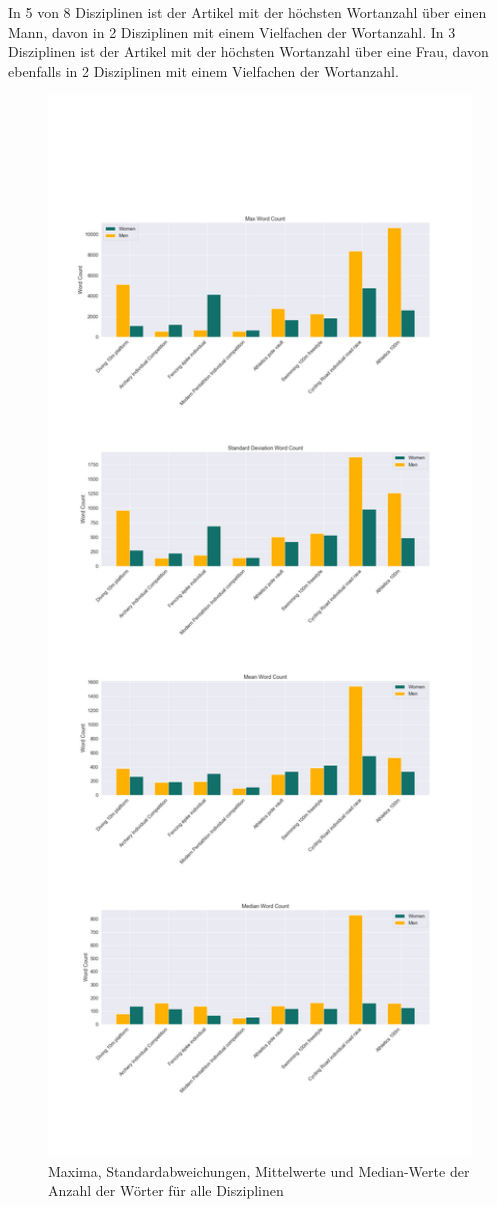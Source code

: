 \documentclass[11pt]{article}
\begin{document}
In 5 von 8 Disziplinen ist der Artikel mit der höchsten Wortanzahl über einen Mann, davon in 2 Disziplinen mit einem Vielfachen der Wortanzahl.
In 3 Disziplinen ist der Artikel mit der höchsten Wortanzahl über eine Frau, davon ebenfalls in 2 Disziplinen mit einem Vielfachen der Wortanzahl. 

\begin{figure}
\caption{Maxima, Standardabweichungen, Mittelwerte und Median-Werte der Anzahl der Wörter für alle Disziplinen}
\includegraphics[width=1\textwidth]{figures/wordcount_extrema.png}
\end{figure}
\end{document}
